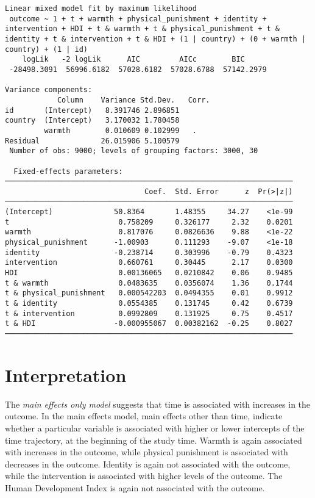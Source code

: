 \documentclass[
  letterpaper,
  DIV=11,
  numbers=noendperiod]{scrreprt}
\begin{document}
\begin{verbatim}
Linear mixed model fit by maximum likelihood
 outcome ~ 1 + t + warmth + physical_punishment + identity + intervention + HDI + t & warmth + t & physical_punishment + t & identity + t & intervention + t & HDI + (1 | country) + (0 + warmth | country) + (1 | id)
    logLik   -2 logLik      AIC         AICc        BIC     
 -28498.3091  56996.6182  57028.6182  57028.6788  57142.2979

Variance components:
            Column    Variance Std.Dev.   Corr.
id       (Intercept)   8.391746 2.896851
country  (Intercept)   3.170032 1.780458
         warmth        0.010609 0.102999   .  
Residual              26.015906 5.100579
 Number of obs: 9000; levels of grouping factors: 3000, 30

  Fixed-effects parameters:
──────────────────────────────────────────────────────────────────
                                Coef.  Std. Error      z  Pr(>|z|)
──────────────────────────────────────────────────────────────────
(Intercept)              50.8364       1.48355     34.27    <1e-99
t                         0.758209     0.326177     2.32    0.0201
warmth                    0.817076     0.0826636    9.88    <1e-22
physical_punishment      -1.00903      0.111293    -9.07    <1e-18
identity                 -0.238714     0.303996    -0.79    0.4323
intervention              0.660761     0.30445      2.17    0.0300
HDI                       0.00136065   0.0210842    0.06    0.9485
t & warmth                0.0483635    0.0356074    1.36    0.1744
t & physical_punishment   0.000542203  0.0494355    0.01    0.9912
t & identity              0.0554385    0.131745     0.42    0.6739
t & intervention          0.0992809    0.131925     0.75    0.4517
t & HDI                  -0.000955067  0.00382162  -0.25    0.8027
──────────────────────────────────────────────────────────────────
\end{verbatim}

\section{Interpretation}\label{interpretation-3}

The \emph{main effects only model} suggests that time is associated with
increases in the outcome. In the main effects model, main effects other
than time, indicate whether a particular variable is associated with
higher or lower intercepts of the time trajectory, at the beginning of
the study time. Warmth is again associated with increases in the
outcome, while physical punishment is associated with decreases in the
outcome. Identity is again not associated with the outcome, while the
intervention is associated with higher levels of the outcome. The Human
Development Index is again not associated with the outcome.
\end{document}
